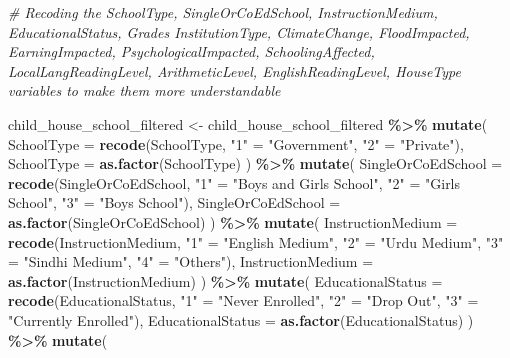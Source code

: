 \documentclass[
]{article}
\newenvironment{Shaded}{\begin{snugshade}}{\end{snugshade}}
\newcommand{\AttributeTok}[1]{\textcolor[rgb]{0.13,0.29,0.53}{#1}}
\newcommand{\CommentTok}[1]{\textcolor[rgb]{0.56,0.35,0.01}{\textit{#1}}}
\newcommand{\FunctionTok}[1]{\textcolor[rgb]{0.13,0.29,0.53}{\textbf{#1}}}
\newcommand{\NormalTok}[1]{#1}
\newcommand{\OtherTok}[1]{\textcolor[rgb]{0.56,0.35,0.01}{#1}}
\newcommand{\SpecialCharTok}[1]{\textcolor[rgb]{0.81,0.36,0.00}{\textbf{#1}}}
\newcommand{\StringTok}[1]{\textcolor[rgb]{0.31,0.60,0.02}{#1}}
\begin{document}
\begin{Shaded}
\begin{Highlighting}[]
\CommentTok{\# Recoding the SchoolType, SingleOrCoEdSchool, InstructionMedium, EducationalStatus, Grades InstitutionType, ClimateChange, FloodImpacted, EarningImpacted, PsychologicalImpacted, SchoolingAffected, LocalLangReadingLevel, ArithmeticLevel, EnglishReadingLevel, HouseType variables to make them more understandable}

\NormalTok{child\_house\_school\_filtered }\OtherTok{\textless{}{-}}\NormalTok{ child\_house\_school\_filtered }\SpecialCharTok{\%\textgreater{}\%} 
  \FunctionTok{mutate}\NormalTok{(}
    \AttributeTok{SchoolType =} \FunctionTok{recode}\NormalTok{(SchoolType, }\StringTok{"1"} \OtherTok{=} \StringTok{"Government"}\NormalTok{, }\StringTok{"2"} \OtherTok{=} \StringTok{"Private"}\NormalTok{),}
    \AttributeTok{SchoolType =} \FunctionTok{as.factor}\NormalTok{(SchoolType)}
\NormalTok{    ) }\SpecialCharTok{\%\textgreater{}\%} 
  \FunctionTok{mutate}\NormalTok{(}
    \AttributeTok{SingleOrCoEdSchool =} \FunctionTok{recode}\NormalTok{(SingleOrCoEdSchool, }\StringTok{"1"} \OtherTok{=} \StringTok{"Boys and Girls School"}\NormalTok{, }\StringTok{"2"} \OtherTok{=} \StringTok{"Girls School"}\NormalTok{, }\StringTok{"3"} \OtherTok{=} \StringTok{"Boys School"}\NormalTok{),}
    \AttributeTok{SingleOrCoEdSchool =} \FunctionTok{as.factor}\NormalTok{(SingleOrCoEdSchool)}
\NormalTok{  ) }\SpecialCharTok{\%\textgreater{}\%}
  \FunctionTok{mutate}\NormalTok{(}
    \AttributeTok{InstructionMedium =} \FunctionTok{recode}\NormalTok{(InstructionMedium, }\StringTok{"1"} \OtherTok{=} \StringTok{"English Medium"}\NormalTok{, }\StringTok{"2"} \OtherTok{=} \StringTok{"Urdu Medium"}\NormalTok{, }\StringTok{"3"} \OtherTok{=} \StringTok{"Sindhi Medium"}\NormalTok{, }\StringTok{"4"} \OtherTok{=} \StringTok{"Others"}\NormalTok{),}
    \AttributeTok{InstructionMedium =} \FunctionTok{as.factor}\NormalTok{(InstructionMedium)}
\NormalTok{  ) }\SpecialCharTok{\%\textgreater{}\%}
  \FunctionTok{mutate}\NormalTok{(}
    \AttributeTok{EducationalStatus =} \FunctionTok{recode}\NormalTok{(EducationalStatus, }\StringTok{"1"} \OtherTok{=} \StringTok{"Never Enrolled"}\NormalTok{, }\StringTok{"2"} \OtherTok{=} \StringTok{"Drop Out"}\NormalTok{, }\StringTok{"3"} \OtherTok{=} \StringTok{"Currently Enrolled"}\NormalTok{),}
    \AttributeTok{EducationalStatus =} \FunctionTok{as.factor}\NormalTok{(EducationalStatus)}
\NormalTok{  ) }\SpecialCharTok{\%\textgreater{}\%}
  \FunctionTok{mutate}\NormalTok{(}

\end{Highlighting}
\end{Shaded}
\end{document}
